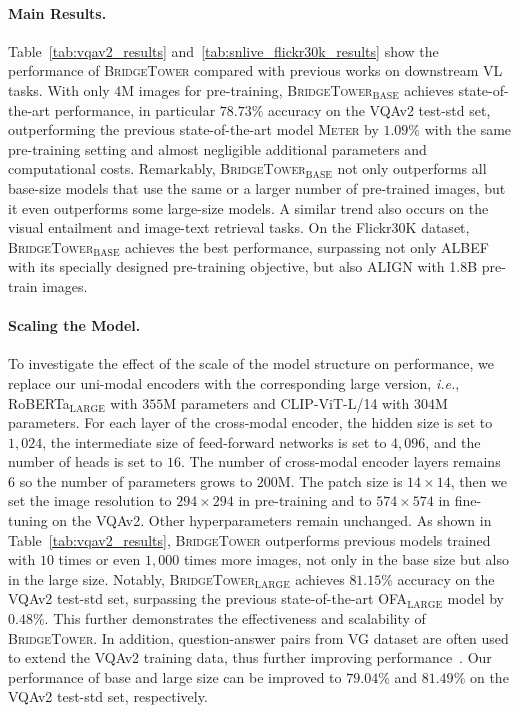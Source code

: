 \documentclass[letterpaper]{article} %
\newcommand{\methodname}[0]{\textsc{BridgeTower}}
\newcommand{\modelbase}[0]{$_{\text{BASE}}$}
\newcommand{\modellarge}[0]{$_{\text{LARGE}}$}
\newcommand{\metername}[0]{\textsc{Meter}}
\newcommand{\ie}[0]{\textit{i.e.},}
\begin{document}
\paragraph{Main Results.}

Table~\ref{tab:vqav2_results} and~\ref{tab:snlive_flickr30k_results} show the performance of \methodname{} compared with previous works on downstream VL tasks. 
With only $4$M images for pre-training, \methodname{}\modelbase{} achieves state-of-the-art performance, 
in particular $78.73\%$ accuracy on the VQAv2 test-std set, outperforming the previous state-of-the-art model \metername{} by $1.09\%$ with the same pre-training setting and almost negligible additional parameters and computational costs.
Remarkably, \methodname{}\modelbase{} not only outperforms all base-size models that use the same or a larger number of pre-trained images, but it even outperforms some large-size models.
A similar trend also occurs on the visual entailment and image-text retrieval tasks. 
On the Flickr30K dataset, \methodname{}\modelbase{} achieves the best performance, surpassing not only ALBEF with its specially designed pre-training objective, but also ALIGN with 1.8B pre-train images.

\paragraph{Scaling the Model.}
To investigate the effect of the scale of the model structure on performance, we replace our uni-modal encoders with the corresponding large version, \ie{} RoBERTa\modellarge{} with $355$M parameters and CLIP-ViT-L/14 with $304$M parameters. 
For each layer of the cross-modal encoder, the hidden size is set to $1,024$, the intermediate size of feed-forward networks is set to $4,096$, and the number of heads is set to $16$. The number of cross-modal encoder layers remains $6$ so the number of parameters grows to $200$M.
The patch size is $14 \times 14$, then we set the image resolution to $294 \times 294$ in pre-training and to $574 \times 574$ in fine-tuning on the VQAv2. Other hyperparameters remain unchanged.
As shown in Table~\ref{tab:vqav2_results}, \methodname{} outperforms previous models trained with $10$ times or even $1,000$ times more images, not only in the base size but also in the large size. Notably, \methodname{}\modellarge{} achieves $81.15\%$ accuracy on the VQAv2 test-std set, surpassing the previous state-of-the-art OFA\modellarge{} model by $0.48\%$.
This further demonstrates the effectiveness and scalability of \methodname{}.
In addition, question-answer pairs from VG dataset are often used to extend the VQAv2 training data, thus further improving performance~\citep{teney2018tips, Yu_2019_CVPR}.
Our performance of base and large size can be improved to $79.04\%$ and $81.49\%$ on the VQAv2 test-std set, respectively.
\end{document}
